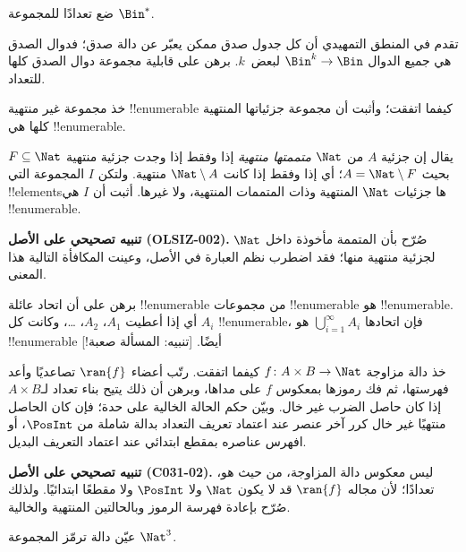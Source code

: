 \documentclass[../../../include/open-logic-section]{subfiles}
\begin{document}
\begin{prob}
ضع تعدادًا للمجموعة $\Bin^*$.
\end{prob}

\begin{prob}
تقدم في المنطق التمهيدي أن كل جدول صدق ممكن يعبّر عن دالة صدق؛
فدوال الصدق هي جميع الدوال $\Bin^k \to \Bin$ لبعض~$k$.
برهن على قابلية مجموعة دوال الصدق كلها للتعداد.
\end{prob}

\begin{prob}
خذ مجموعة غير منتهية !!{enumerable} كيفما اتفقت؛ وأثبت أن مجموعة
جزئياتها المنتهية كلها هي !!{enumerable}.
\end{prob}

\begin{prob}
يقال إن جزئية $A$ من $\Nat$ \emph{متممتها منتهية} إذا وفقط إذا وجدت
جزئية منتهية $F\subseteq\Nat$ بحيث $A=\Nat\setminus F$؛ أي إذا وفقط إذا
كانت $\Nat\setminus A$ منتهية. ولتكن $I$ المجموعة التي !!{element}sها
جزئيات $\Nat$ المنتهية وذات المتممات المنتهية، ولا غيرها. أثبت أن $I$
هي !!{enumerable}.
\end{prob}

\begin{editorial}
\textbf{تنبيه تصحيحي على الأصل (OLSIZ-002).} صُرّح بأن المتممة مأخوذة
داخل $\Nat$ لجزئية منتهية منها؛ فقد اضطرب نظم العبارة في الأصل،
وعينت المكافأة التالية هذا المعنى.
\end{editorial}

\begin{prob}
برهن على أن اتحاد عائلة !!{enumerable} من مجموعات !!{enumerable}
هو !!{enumerable}. أي إذا أعطيت $A_1$، $A_2$، \dots{}، وكانت كل
$A_i$ !!{enumerable}، فإن اتحادها $\bigcup_{i=1}^\infty
A_i$ هو !!{enumerable} أيضًا. [تنبيه: المسألة صعبة!]
\end{prob}

\begin{prob}
خذ دالة مزاوجة $f \colon A \times B \to \Nat$ كيفما اتفقت.
رتّب أعضاء $\ran{f}$ تصاعديًا وأعد فهرستها، ثم فك رموزها بمعكوس $f$
على مداها، وبرهن أن ذلك يتيح بناء تعداد لـ$A \times B$ إذا كان حاصل
الضرب غير خال. وبيّن حكم الحالة الخالية على حدة؛ فإن كان الحاصل منتهيًا
غير خال كرر آخر عنصر عند اعتماد تعريف التعداد بدالة شاملة من $\PosInt$،
أو افهرس عناصره بمقطع ابتدائي عند اعتماد التعريف البديل.
\end{prob}

\textbf{تنبيه تصحيحي على الأصل (C031-02).} ليس معكوس دالة المزاوجة، من حيث هو،
تعدادًا؛ لأن مجاله $\ran{f}$ قد لا يكون $\Nat$ ولا $\PosInt$ ولا مقطعًا
ابتدائيًا. ولذلك صُرّح بإعادة فهرسة الرموز وبالحالتين المنتهية والخالية.

\begin{prob}
عيّن دالة ترمّز المجموعة $\Nat^3$.
\end{prob}
\end{document}
